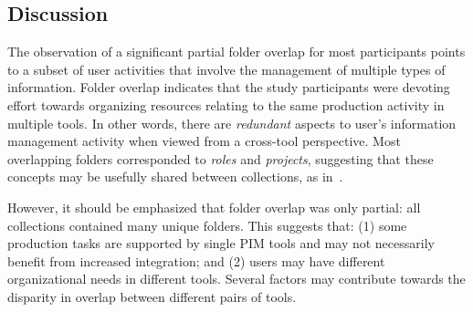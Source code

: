 \subsection{Discussion}
\label{exp-study:Results-folder-overlap-discussion}


The observation of a significant partial folder overlap for most participants points to a subset of user activities that involve the management of multiple types of information.  Folder overlap indicates that the study participants were devoting effort towards organizing resources relating to the same production activity in multiple tools.  In other words, there are \textit{redundant} aspects to user's information management activity when viewed from a cross-tool perspective.  Most overlapping folders corresponded to \textit{roles} and \textit{projects}, suggesting that these concepts may be usefully shared between collections, as in~\citep{Kaptelinin:03}.

However, it should be emphasized that folder overlap was only partial: all collections contained many unique folders.  This suggests that: (1) some production tasks are supported by single PIM tools and may not necessarily benefit from increased integration; and (2) users may have different organizational needs in different tools. 
Several factors may contribute towards the disparity in overlap between different pairs of tools.

